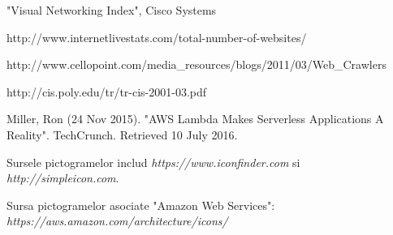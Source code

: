 \begin{thebibliography}{99}

"Visual Networking Index", Cisco Systems
  
http://www.internetlivestats.com/total-number-of-websites/
  
http://www.cellopoint.com/media\_resources/blogs/2011/03/Web\_Crawlers

http://cis.poly.edu/tr/tr-cis-2001-03.pdf

Miller, Ron (24 Nov 2015). "AWS Lambda Makes Serverless Applications A Reality". TechCrunch. Retrieved 10 July 2016.

Sursele pictogramelor includ \emph{https://www.iconfinder.com} si \emph{http://simpleicon.com}.

Sursa pictogramelor asociate "Amazon Web Services": \emph{https://aws.amazon.com/architecture/icons/}

\end{thebibliography}